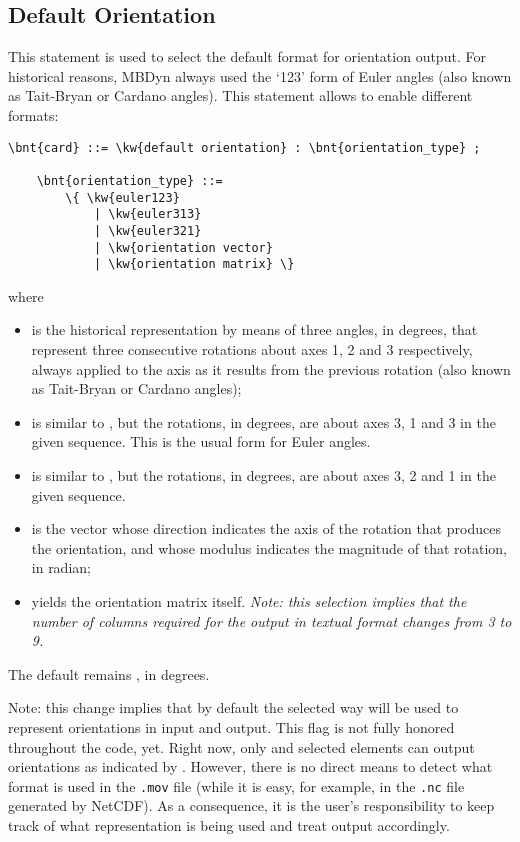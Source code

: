 \subsection{Default Orientation}\label{sec:CONTROLDATA:DEFAULTORIENTATION}
This statement is used to select the default format for orientation output.
For historical reasons, MBDyn always used the `123' form of Euler angles
(also known as Tait-Bryan or Cardano angles).
This statement allows to enable different formats:
\begin{Verbatim}[commandchars=\\\{\}]
    \bnt{card} ::= \kw{default orientation} : \bnt{orientation_type} ;

    \bnt{orientation_type} ::=
        \{ \kw{euler123}
            | \kw{euler313}
            | \kw{euler321}
            | \kw{orientation vector}
            | \kw{orientation matrix} \}
\end{Verbatim}
where
\begin{itemize}
\item {} is the historical representation by means 
	of three angles, in degrees, that represent three consecutive rotations
	about axes 1, 2 and 3 respectively, always applied to the axis
	as it results from the previous rotation (also known as Tait-Bryan or Cardano angles);
\item {} is similar to , but the rotations, in degrees,
are about axes 3, 1 and 3 in the given sequence.
This is the usual form for Euler angles.
\item {} is similar to , but the rotations, in degrees,
are about axes 3, 2 and 1 in the given sequence.
\item {} is the vector whose direction indicates
	the axis of the rotation that produces the orientation,
	and whose modulus indicates the magnitude of that rotation, in radian;
\item {} yields the orientation matrix itself.
	\emph{Note: this selection implies that the number of columns required for the output
	in textual format changes from 3 to 9.}
\end{itemize}
The default remains , in degrees.

Note: this change implies that by default the selected way will be used
to represent orientations in input and output.
This flag is not fully honored throughout the code, yet.
Right now, only  and selected elements
can output orientations as indicated by .
However, there is no direct means to detect what format is used
in the \texttt{.mov} file (while it is easy, for example, in the \texttt{.nc}
file generated by NetCDF).
As a consequence, it is the user's responsibility to keep track
of what representation is being used and treat output accordingly.

